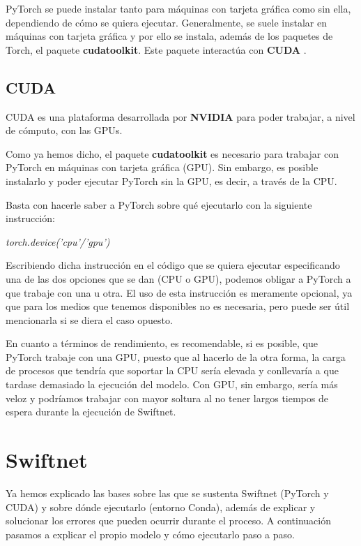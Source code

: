 PyTorch se puede instalar tanto para máquinas con tarjeta gráfica como sin ella, dependiendo de cómo se quiera ejecutar. Generalmente, se suele instalar en máquinas con tarjeta gráfica y por ello se instala, además de los paquetes de Torch, el paquete \textbf{cudatoolkit}. Este paquete interactúa con \textbf{CUDA} \cite{cuda}.

\subsection{CUDA}

CUDA \cite{cuda} es una plataforma desarrollada por \textbf{NVIDIA} para poder trabajar, a nivel de cómputo, con las \ac{GPU}s.

Como ya hemos dicho, el paquete \textbf{cudatoolkit} es necesario para trabajar con PyTorch en máquinas con tarjeta gráfica (\ac{GPU}). Sin embargo, es posible instalarlo y poder ejecutar PyTorch sin la \ac{GPU}, es decir, a través de la \ac{CPU}.

Basta con hacerle saber a PyTorch sobre qué ejecutarlo con la siguiente instrucción:

\begin{center}
\textit{torch.device('cpu'/'gpu')}
\end{center}

Escribiendo dicha instrucción en el código que se quiera ejecutar especificando una de las dos opciones que se dan (\ac{CPU} o \ac{GPU}), podemos obligar a PyTorch a que trabaje con una u otra. El uso de esta instrucción es meramente opcional, ya que para los medios que tenemos disponibles no es necesaria, pero puede ser útil mencionarla si se diera el caso opuesto.

En cuanto a términos de rendimiento, es recomendable, si es posible, que PyTorch trabaje con una \ac{GPU}, puesto que al hacerlo de la otra forma, la carga de procesos que tendría que soportar la \ac{CPU} sería elevada y conllevaría a que tardase demasiado la ejecución del modelo. Con \ac{GPU}, sin embargo, sería más veloz y podríamos trabajar con mayor soltura al no tener largos tiempos de espera durante la ejecución de Swiftnet.


\section{Swiftnet}

Ya hemos explicado las bases sobre las que se sustenta Swiftnet (PyTorch y CUDA) y sobre dónde ejecutarlo (entorno Conda), además de explicar y solucionar los errores que pueden ocurrir durante el proceso. A continuación pasamos a explicar el propio modelo y cómo ejecutarlo paso a paso.
